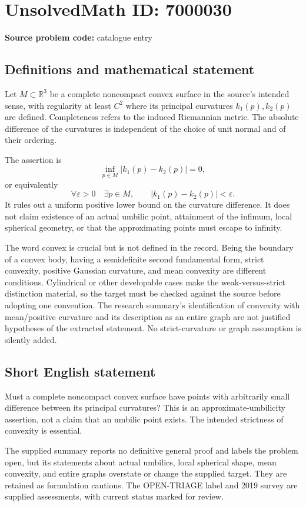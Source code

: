 \documentclass[11pt]{article}
\newcommand{\R}{\mathbb{R}}
\begin{document}
\section*{UnsolvedMath ID: 7000030}
\textbf{Source problem code:} catalogue entry
\subsection{Definitions and mathematical statement}
Let $M\subset\R^3$ be a complete noncompact convex surface in the source's intended sense, with regularity at least $C^2$ where its principal curvatures $k_1(p),k_2(p)$ are defined. Completeness refers to the induced Riemannian metric. The absolute difference of the curvatures is independent of the choice of unit normal and of their ordering.

The assertion is
\[
 \inf_{p\in M}|k_1(p)-k_2(p)|=0,
\]
or equivalently
\[
 \forall\varepsilon>0\quad\exists p\in M,
 \qquad |k_1(p)-k_2(p)|<\varepsilon.
\]
It rules out a uniform positive lower bound on the curvature difference. It does not claim existence of an actual umbilic point, attainment of the infimum, local spherical geometry, or that the approximating points must escape to infinity.

The word convex is crucial but is not defined in the record. Being the boundary of a convex body, having a semidefinite second fundamental form, strict convexity, positive Gaussian curvature, and mean convexity are different conditions. Cylindrical or other developable cases make the weak-versus-strict distinction material, so the target must be checked against the source before adopting one convention. The research summary's identification of convexity with mean/positive curvature and its description as an entire graph are not justified hypotheses of the extracted statement. No strict-curvature or graph assumption is silently added.
\subsection{Short English statement}
Must a complete noncompact convex surface have points with arbitrarily small difference between its principal curvatures? This is an approximate-umbilicity assertion, not a claim that an umbilic point exists. The intended strictness of convexity is essential.

The supplied summary reports no definitive general proof and labels the problem open, but its statements about actual umbilics, local spherical shape, mean convexity, and entire graphs overstate or change the supplied target. They are retained as formulation cautions. The OPEN-TRIAGE label and 2019 survey are supplied assessments, with current status marked for review.
\end{document}
